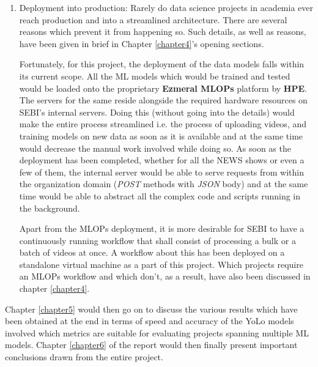 \begin{enumerate}
  \item Deployment into production: Rarely do data science projects in academia ever reach production and into a streamlined architecture. There are several reasons which prevent it from happening so. Such details, as well as reasons, have been given in brief in Chapter \ref{chapter4}’s opening sections. \par
        Fortunately, for this project, the deployment of the data models falls within its current scope. All the ML models which would be trained and tested would be loaded onto the proprietary \textbf{Ezmeral MLOPs} platform by \textbf{HPE}. The servers for the same reside alongside the required hardware resources on SEBI’s internal servers. Doing this (without going into the details) would make the entire process streamlined i.e. the process of uploading videos, and training models on new data as soon as it is available and at the same time would decrease the manual work involved while doing so. As soon as the deployment has been completed, whether for all the NEWS shows or even a few of them, the internal server would be able to serve requests from within the organization domain (\textit{POST} methods with \textit{JSON} body) and at the same time would be able to abstract all the complex code and scripts running in the background. \par

        Apart from the MLOPs deployment, it is more desirable for SEBI to have a continuously running workflow that shall consist of processing a bulk or a batch of videos at once. A workflow about this has been deployed on a standalone virtual machine as a part of this project. Which projects require an MLOPs workflow and which don’t, as a result, have also been discussed in chapter \ref{chapter4}.
\end{enumerate}


Chapter \ref{chapter5} would then go on to discuss the various results which have been obtained at the end in terms of speed and accuracy of the YoLo models involved which metrics are suitable for evaluating projects spanning multiple ML models. Chapter \ref{chapter6} of the report would then finally present important conclusions drawn from the entire project.
